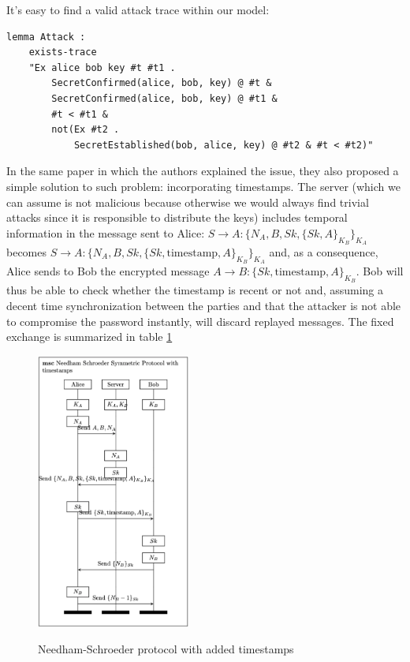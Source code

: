 \documentclass[fleqn,10pt]{SelfArx} %
\begin{document}
It's easy to find a valid attack trace within our model:

\begin{lstlisting}[language=Tamarin]
lemma Attack :
    exists-trace
    "Ex alice bob key #t #t1 . 
        SecretConfirmed(alice, bob, key) @ #t &
        SecretConfirmed(alice, bob, key) @ #t1 &
        #t < #t1 &
        not(Ex #t2 .
            SecretEstablished(bob, alice, key) @ #t2 & #t < #t2)"
\end{lstlisting}

In the same paper in which the authors explained the issue, they also proposed a simple solution to such problem: incorporating timestamps. The server (which we can assume is not malicious because otherwise we would always find trivial attacks since it is responsible to distribute the keys) includes temporal information in the message sent to Alice: $S \to A: \{N_A, B, Sk, \{Sk, A\}_{K_B} \}_{K_A}$ becomes $S \to A: \{N_A, B, Sk, \{Sk, \textrm{timestamp}, A\}_{K_B} \}_{K_A}$ and, as a consequence, Alice sends to Bob the encrypted message $A \to B: \{Sk, \textrm{timestamp}, A\}_{K_B}$. Bob will thus be able to check whether the timestamp is recent or not and, assuming a decent time synchronization between the parties and that the attacker is not able to compromise the password instantly, will discard replayed messages. The fixed exchange is summarized in table \ref{fig:NS_fixed}

\begin{figure}[h]
    \centering
    \captionsetup{justification=centering, margin=1cm}
    \includegraphics[width=0.45\textwidth]{Figures/NS_fixed.png}
    \label{fig:NS_fixed}
    \caption{Needham-Schroeder protocol with added timestamps}
\end{figure}
%
\end{document}
